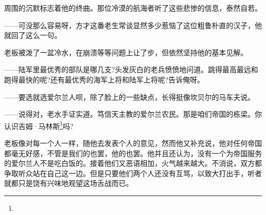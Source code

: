 \par 周围的沉默标志着他的终曲。那位冷漠的航海者听了这些悲惨的信息，泰然自若。
\par ——可没那么容易呀，方才这番老生常谈显然多少惹恼了这位粗鲁朴直的汉子，他就回了这么一句。
\par 老板被泼了一盆冷水，在崩溃等等问题上让了步，但依然坚持他的基本见解。
\par ——陆军里最优秀的部队是哪几支?头发灰白的老兵愤愤地问道。跳得最高最远和跑得最快的呢?还有最优秀的海军上将和陆军上将呢?告诉俺呀。
\par ——要选就选爱尔兰人呗，除了脸上的一些缺点，长得挺像坎贝尔的马车夫说。
\par ——说得对，老水手证实道。笃信天主教的爱尔兰农民。那是咱们帝国的栋梁。你认识吉姆·马林斯\footnote{}吗?
\par 老板像对每一个人一样，随他去发表个人的意见，然而他又补充说，他对任何帝国都毫无好感，不管是我们的也罢，他的也罢。他并且还认为，没有一个为帝国服务的爱尔兰人不是吃白饭的。接着他们又恶语相加，火气越来越大。不消说，双方都争取听众站在自己这一边。但是只要他们两个人还没有互骂，以致大打出手，听者就都只是饶有兴味地观望这场舌战而已。
